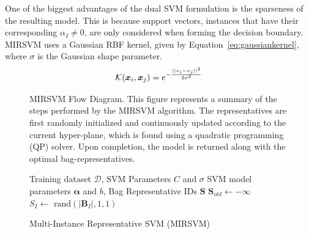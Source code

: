 One of the biggest advantages of the dual SVM formulation is the sparseness of the resulting model. This is because support vectors, instances that have their corresponding $\alpha_I \neq 0$, are only considered when forming the decision boundary. MIRSVM uses a Gaussian RBF kernel, given by Equation~\eqref{eq:gaussiankernel}, where $\sigma$ is the Gaussian shape parameter.
\begin{equation}
\label{eq:gaussiankernel}
\centering
\mathcal{K}(\bm x_i, \bm x_j) = e^{-\frac{\norm{x_i - x_j}^2}{2\sigma^2}}
\end{equation}
\begin{figure}[tpb]
\centering
\small
\label{fig:mirsvm}
\begin{minipage}{\textwidth}
\caption{MIRSVM Flow Diagram. This figure represents a summary of the steps performed by the MIRSVM algorithm. The representatives are first randomly initialized and continuously updated according to the current hyper-plane, which is found using a quadratic programming (QP) solver. Upon completion, the model is returned along with the optimal bag-representatives.}
\end{minipage}
\begin{algorithm}[H]
\caption{Multi-Instance Representative SVM (MIRSVM)}
\label{alg:mirsvm} 
\begin{algorithmic}[1]
\renewcommand{\algorithmicrequire}{\textbf{Input:}}
\renewcommand{\algorithmicensure}{\textbf{Output:}}
\Require Training dataset $\mathcal{D}$, SVM Parameters $C$ and $\sigma$
\Ensure  SVM model parameters $\bm \alpha$ and $b$, Bag Representative IDs $\bm S$
\State $\bm S_{old} \leftarrow \bm -\infty$
\State $S_I \leftarrow \text{ rand}\left(|\bm B_I|,1,1\right)$ 

\end{algorithmic}
\end{algorithm}
\end{figure}

